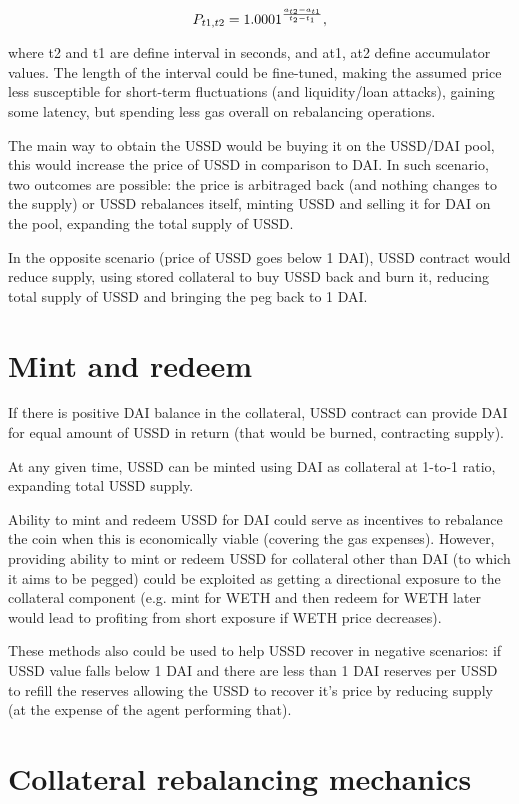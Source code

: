 \[ P_{ t1,t2 } = 1.0001^{ { a_{t2}-a_{t1} } \over {t_2 - t_1} }, \]

where t2 and t1 are define interval in seconds, and at1, at2 define accumulator values. 
The length of the interval could be fine-tuned, making the assumed price less susceptible 
for short-term fluctuations (and liquidity/loan attacks), gaining some latency, but spending 
less gas overall on rebalancing operations.

The main way to obtain the USSD would be buying it on the USSD/DAI pool, this would increase 
the price of USSD in comparison to DAI. In such scenario, two outcomes are possible: 
the price is arbitraged back (and nothing changes to the supply) or USSD rebalances itself, 
minting USSD and selling it for DAI on the pool, expanding the total supply of USSD.

In the opposite scenario (price of USSD goes below 1 DAI), USSD contract would reduce supply, 
using stored collateral to buy USSD back and burn it, reducing total supply of USSD and 
bringing the peg back to 1 DAI.

\section{Mint and redeem}

If there is positive DAI balance in the collateral, USSD contract can provide DAI for equal 
amount of USSD in return (that would be burned, contracting supply).

At any given time, USSD can be minted using DAI as collateral at 1-to-1 ratio, expanding 
total USSD supply.

Ability to mint and redeem USSD for DAI could serve as incentives to rebalance the coin 
when this is economically viable (covering the gas expenses). However, providing ability 
to mint or redeem USSD for collateral other than DAI (to which it aims to be pegged) 
could be exploited as getting a directional exposure to the collateral component 
(e.g. mint for WETH and then redeem for WETH later would lead to profiting from short 
exposure if WETH price decreases).

These methods also could be used to help USSD recover in negative scenarios: if USSD value 
falls below 1 DAI and there are less than 1 DAI reserves per USSD to refill the reserves 
allowing the USSD to recover it's price by reducing supply (at the expense of the agent 
performing that).

\section{Collateral rebalancing mechanics}

